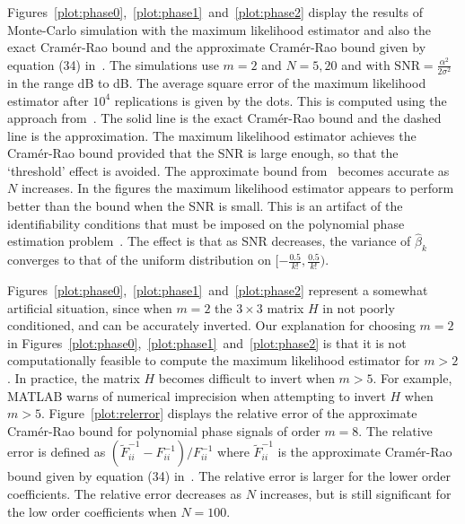 \documentclass[review]{elsarticle}
\begin{document}
Figures~\ref{plot:phase0},~\ref{plot:phase1}~and~\ref{plot:phase2} display the results of Monte-Carlo simulation with the maximum likelihood estimator and also the exact Cram\'{e}r-Rao bound and the approximate Cram\'{e}r-Rao bound given by equation (34) in~\cite{Peleg1991_CRB_PPS_1991}.  The simulations use $m=2$ and $N=5,20$ and with $\text{SNR} = \tfrac{\alpha^2}{2\sigma^2}$ in the range \unit[-5]{dB} to \unit[25]{dB}.   The average square error of the maximum likelihood estimator after $10^4$ replications is given by the dots.  This is computed using the approach from~\cite[Sec.~10.1]{McKilliam2010thesis}.  The solid line is the exact Cram\'{e}r-Rao bound and the dashed line is the approximation.  The maximum likelihood estimator achieves the Cram\'{e}r-Rao bound provided that the SNR is large enough, so that the `threshold' effect is avoided.  The approximate bound from~\cite{Peleg1991_CRB_PPS_1991} becomes accurate as $N$ increases.  In the figures the maximum likelihood estimator appears to perform better than the bound when the SNR is small.  This is an artifact of the identifiability conditions that must be imposed on the polynomial phase estimation problem~\cite[Ch.~7]{McKilliam2010thesis}\cite{McKilliam2009IndentifiabliltyAliasingPolyphase}.  The effect is that as SNR decreases, the variance of $\hat{\beta}_k$ converges to that of the uniform distribution on $[-\tfrac{0.5}{k!},\tfrac{0.5}{k!})$.

Figures~\ref{plot:phase0},~\ref{plot:phase1}~and~\ref{plot:phase2} represent a somewhat artificial situation, since when $m=2$ the $3 \times 3$ matrix $H$ in not poorly conditioned, and can be accurately inverted.  Our explanation for choosing $m=2$ in Figures~\ref{plot:phase0},~\ref{plot:phase1}~and~\ref{plot:phase2} is that it is not computationally feasible to compute the maximum likelihood estimator for $m>2$.  In practice, the matrix $H$ becomes difficult to invert when $m>5$.  For example, MATLAB warns of numerical imprecision when attempting to invert $H$ when $m>5$.  Figure~\ref{plot:relerror} displays the relative error of the approximate Cram\'{e}r-Rao bound for polynomial phase signals of order $m=8$.  The relative error is defined as $(\tilde{F}_{ii}^{-1} - F_{ii}^{-1})/F_{ii}^{-1}$ where $\tilde{F}_{ii}^{-1}$ is the approximate Cram\'{e}r-Rao bound given by equation (34) in~\cite{Peleg1991_CRB_PPS_1991}.  The relative error is larger for the lower order coefficients.  The relative error decreases as $N$ increases, but is still significant for the low order coefficients when $N=100$.
\end{document}
